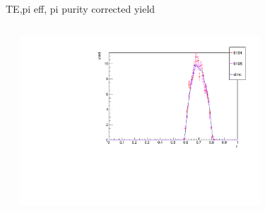 \begin{frame}{TE,pi eff, pi purity corrected yield}
\begin{columns}
\begin{column}[T]{0.5\textwidth}
\end{column}
\begin{column}[T]{0.5\textwidth}
\includegraphics[width = 0.7\textwidth]{results/yield/check/yieldcheck_150_pos.pdf}
\end{column}
\end{columns}
\end{frame}
